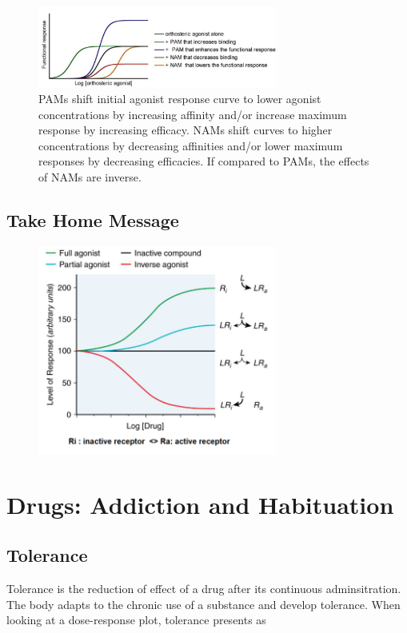 \documentclass{book}
\begin{document}
\begin{figure}[H]
    \includegraphics[width=0.7\textwidth, center]{images/image23.png}
    \caption{PAMs shift initial agonist response curve to lower agonist concentrations by increasing affinity and/or increase maximum response by increasing efficacy. NAMs shift curves to higher concentrations by decreasing affinities and/or lower maximum responses by decreasing efficacies. If compared to PAMs, the effects of NAMs are inverse.}
\end{figure}

\section{Take Home Message}

\begin{figure}[H]
    \includegraphics[width=0.7\textwidth, center]{images/image24.png}
\end{figure}

\chapter{Drugs: Addiction and Habituation}
\section{Tolerance}
Tolerance is the reduction of effect of a drug after its continuous adminsitration.
The body adapts to the chronic use of a substance and develop tolerance.
When looking at a dose-response plot, tolerance presents as
\end{document}

